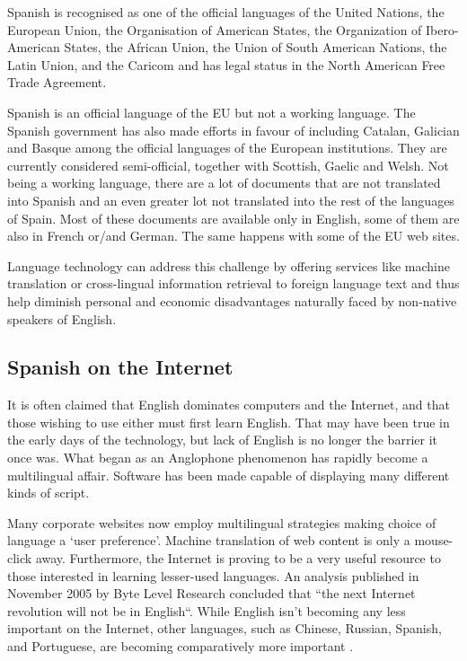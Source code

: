 \begin{multicols}{2}
Spanish is recognised as one of the official languages of the United Nations, the European Union, the Organisation of American States, the Organization of Ibero-American States, the African Union, the Union of South American Nations, the Latin Union, and the Caricom and has legal status in the North American Free Trade Agreement.


Spanish is an official language of the EU but not a working language. The Spanish government has also made efforts in favour of including Catalan, Galician and Basque among the official languages of the European institutions. They are currently considered semi-official, together with Scottish, Gaelic and Welsh. Not being a working language, there are a lot of documents that are not translated into Spanish and an even greater lot not translated into the rest of the languages of Spain. Most of these documents are available only in English, some of them are also in French or/and German. The same happens with some of the EU web sites.

Language technology can address this challenge by offering services like machine translation or cross-lingual information retrieval to foreign language text and thus help diminish personal and economic disadvantages naturally faced by non-native speakers of English.


\subsection{Spanish on the Internet}

It is often claimed that English dominates computers and the Internet, and that those wishing to use either must first learn English. That may have been true in the early days of the technology, but lack of English is no longer the barrier it once was. What began as an Anglophone phenomenon has rapidly become a multilingual affair. Software has been made capable of displaying many different kinds of script. \cite{espanolred}


Many corporate websites now employ multilingual strategies making choice of language a ‘user preference’. Machine translation of web content is only a mouse-click away. Furthermore, the Internet is proving to be a very useful resource to those interested in learning lesser-used languages. An analysis published in November 2005 by Byte Level Research concluded that “the next Internet revolution will not be in English“. While English isn’t becoming any less important on the Internet, other languages, such as Chinese, Russian, Spanish, and Portuguese, are becoming comparatively more important \cite{britishcouncil}.


\end{multicols}
